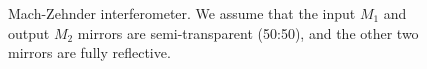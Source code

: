 \begin{figure}
\centering



\caption{Mach-Zehnder interferometer. We assume that the input $M_1$ and
  output $M_2$ mirrors are semi-transparent (50:50), and the other two mirrors
  are fully reflective.} 
\label{figPart2Interfero_4}
\end{figure}